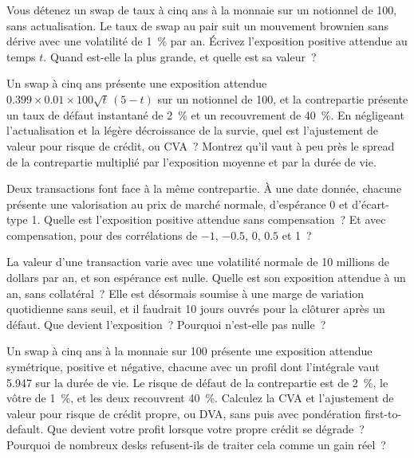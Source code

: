 \begin{question}\label{iq:iv2:credit-and-xva:10}
Vous détenez un swap de taux à cinq ans à la monnaie sur un notionnel de 100, sans actualisation. Le taux de swap au pair suit un mouvement brownien sans dérive avec une volatilité de 1~\% par an. Écrivez l'exposition positive attendue au temps $t$. Quand est-elle la plus grande, et quelle est sa valeur~?
\end{question}

\begin{question}\label{iq:iv2:credit-and-xva:11}
Un swap à cinq ans présente une exposition attendue $0.399 \times 0.01 \times 100 \sqrt{t}\,(5 - t)$ sur un notionnel de 100, et la contrepartie présente un taux de défaut instantané de 2~\% et un recouvrement de 40~\%. En négligeant l'actualisation et la légère décroissance de la survie, quel est l'ajustement de valeur pour risque de crédit, ou CVA~? Montrez qu'il vaut à peu près le spread de la contrepartie multiplié par l'exposition moyenne et par la durée de vie.
\end{question}

\begin{question}\label{iq:iv2:credit-and-xva:12}
Deux transactions font face à la même contrepartie. À une date donnée, chacune présente une valorisation au prix de marché normale, d'espérance 0 et d'écart-type 1. Quelle est l'exposition positive attendue sans compensation~? Et avec compensation, pour des corrélations de $-1$, $-0.5$, 0, $0.5$ et 1~?
\end{question}

\begin{question}\label{iq:iv2:credit-and-xva:13}
La valeur d'une transaction varie avec une volatilité normale de 10 millions de dollars par an, et son espérance est nulle. Quelle est son exposition attendue à un an, sans collatéral~? Elle est désormais soumise à une marge de variation quotidienne sans seuil, et il faudrait 10 jours ouvrés pour la clôturer après un défaut. Que devient l'exposition~? Pourquoi n'est-elle pas nulle~?
\end{question}

\begin{question}\label{iq:iv2:credit-and-xva:14}
Un swap à cinq ans à la monnaie sur 100 présente une exposition attendue symétrique, positive et négative, chacune avec un profil dont l'intégrale vaut 5.947 sur la durée de vie. Le risque de défaut de la contrepartie est de 2~\%, le vôtre de 1~\%, et les deux recouvrent 40~\%. Calculez la CVA et l'ajustement de valeur pour risque de crédit propre, ou DVA, sans puis avec pondération first-to-default. Que devient votre profit lorsque votre propre crédit se dégrade~? Pourquoi de nombreux desks refusent-ils de traiter cela comme un gain réel~?
\end{question}

